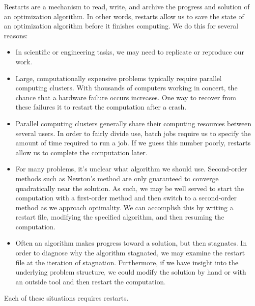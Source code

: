 \documentclass{report}
\begin{document}
        Restarts are a mechanism to read, write, and archive the progress and solution of an optimization algorithm.  In other words, restarts allow us to save the state of an optimization algorithm before it finishes computing.  We do this for several reasons:
\begin{itemize}
    \item In scientific or engineering tasks, we may need to replicate or reproduce our work.

    \item Large, computationally expensive problems typically require parallel computing clusters.  With thousands of computers working in concert, the chance that a hardware failure occurs increases.  One way to recover from these failures it to restart the computation after a crash.

    \item Parallel computing clusters generally share their computing resources between several users.  In order to fairly divide use, batch jobs require us to specify the amount of time required to run a job.  If we guess this number poorly, restarts allow us to complete the computation later.

    \item For many problems, it's unclear what algorithm we should use.  Second-order methods such as Newton's method are only guaranteed to converge quadratically near the solution.  As such, we may be well served to start the computation with a first-order method and then switch to a second-order method as we approach optimality.  We can accomplish this by writing a restart file, modifying the specified algorithm, and then resuming the computation.

    \item Often an algorithm makes progress toward a solution, but then stagnates.  In order to diagnose why the algorithm stagnated, we may examine the restart file at the iteration of stagnation.  Furthermore, if we have insight into the underlying problem structure, we could modify the solution by hand or with an outside tool and then restart the computation.
\end{itemize}
\indent Each of these situations requires restarts.
\end{document}

